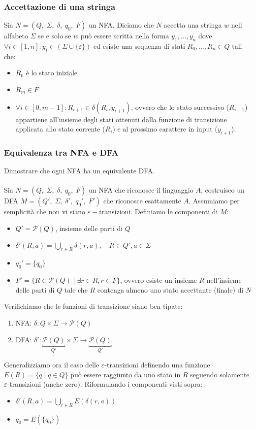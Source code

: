 \documentclass[italian]{article}
\newcommand{\powerset}[1]{\mathcal{P}(#1)}
\let\oldexists\exists
\renewcommand{\exists}{\text{$\;\oldexists$}}
\begin{document}
\subsubsection{Accettazione di una stringa}
Sia $N = (Q,\;\Sigma,\;\delta,\;q_0,\;F)$ un NFA. Diciamo che $N$ accetta una stringa $w$ nell alfabeto $\Sigma$ se e solo se $w$ può essere scritta nella forma $y_1,\dots,y_n$ dove $\forall i \in [1,n]:y_i \in \left( \Sigma \cup \{\varepsilon\} \right)$ ed esiste una sequenza di stati $R_0,\dots,R_n \in Q$ tali che:
\begin{itemize}
	\item $R_0$ è lo stato iniziale
	\item $R_m \in F$
	\item $\forall i \in [0,m-1]: R_{i+1} \in \delta(R_i,y_{i+1})$, ovvero che lo stato successivo ($R_{i+1}$) appartiene all'insieme degli stati ottenuti dalla funzione di transizione applicata allo stato corrente ($R_i$) e al prossimo carattere in input ($y_{i+1}$).
\end{itemize}
\subsubsection{Equivalenza tra NFA e DFA}
Dimostrare che ogni NFA ha un equivalente DFA.\\\\
Sia $N = (Q,\;\Sigma,\;\delta,\;q_0,\;F)$ un NFA che riconosce il linguaggio $A$, costruisco un DFA $M = (Q',\;\Sigma,\;\delta',\;q_0',\;F')$ che riconosce esattamente $A$. Assumiamo per semplicità che non vi siano $\varepsilon-$transizioni. Definiamo le componenti di $M$:
\begin{itemize}
	\item $Q' = \powerset{Q}$, insieme delle parti di $Q$
	\item $\delta'(R,a) = \bigcup\limits_{r\in R}\delta(r,a), \quad R \in Q', a \in \Sigma$
	\item $q_0'=\{q_0\}$
	\item $F' = \{R \in \powerset{Q} \;| \exists r \in R, r \in F\}$, ovvero esiste un insieme $R$ nell'insieme delle parti di $Q$ tale che $R$ contenga almeno uno stato accettante (finale) di $N$
\end{itemize}
Verifichiamo che le funzioni di transizione siano ben tipate:
\begin{enumerate}
	\item NFA: $\delta: Q \times \Sigma \to \powerset{Q}$
	\item DFA: $\delta': \underbracket{\powerset{Q}}_{Q'} \times \Sigma \to \underbracket{\powerset{Q}}_{Q'}$
\end{enumerate}
Generalizziamo ora il caso delle $\varepsilon$-transizioni definendo una funzione $E(R) = \{ q \;|\; q \in Q \}$ può essere raggiunto da uno stato in $R$ seguendo solamente $\varepsilon$-transizioni (anche zero). Riformulando i componenti visti sopra:
\begin{itemize}
	\item $\delta'(R,a) =  \bigcup\limits_{r\in R}E\left(\delta(r,a)\right)$
	\item $q_0 = E(\{q_0\})$
\end{itemize}
\end{document}
